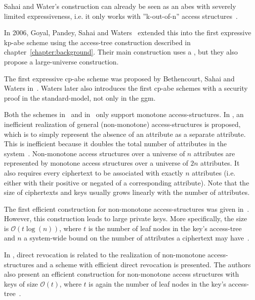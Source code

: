 Sahai and Water's construction can already be seen as an \acrshort{abes} with severely limited expressiveness, i.e. it only works with ''k-out-of-n'' access structures~\cite{goyal_attribute-based_2006}.

In 2006, Goyal, Pandey, Sahai and Waters~\cite{goyal_attribute-based_2006} extended this into the first expressive \acrlong{kp-abe} scheme using the \gls{access-tree} construction described in chapter~\ref{chapter:background}.
Their main construction uses a , but they also propose a \gls{large-universe} construction.

The first expressive \acrlong{cp-abe} scheme was proposed by Bethencourt, Sahai and Waters in~\cite{bethencourt_ciphertext-policy_2007}.
Waters \cite{waters_ciphertext-policy_2011} later also introduces the first \acrshort{cp-abe} schemes with a security proof in the \gls{standard-model}, not only in the \gls{ggm}.

Both the schemes in~\cite{goyal_attribute-based_2006} and in~\cite{bethencourt_ciphertext-policy_2007} only support monotone \glspl{access-structure}.
In \cite{goyal_attribute-based_2006}, an inefficient realization of general (non-monotone) \glspl{access-structure} is proposed, which is to simply represent the absence of an attribute as a separate attribute.
This is inefficient because it doubles the total number of attributes in the system~\cite{goyal_attribute-based_2006}. 
Non-monotone access structures over a universe of $n$ attributes are represented by monotone access structures over a universe of $2n$ attributes.
It also requires every ciphertext to be associated with exactly $n$ attributes (i.e. either with their positive or negated of a corresponding attribute).
Note that the size of ciphertexts and keys usually grows linearly with the number of attributes.

The first efficient construction for non-monotone \glspl{access-structure} was given in~\cite{ostrovsky_attribute-based_2007}. 
However, this construction leads to large private keys.
More specifically, the size is $\mathcal{O}(t \log(n))$, where $t$ is the number of leaf nodes in the key's \gls{access-tree} and $n$ a system-wide bound on the number of attributes a ciphertext may have~\cite{lewko_revocation_2008}.

In \cite{lewko_revocation_2008}, direct revocation is related to the realization of non-monotone \glspl{access-structure} and a scheme with efficient direct revocation is presented.
The authors also present an efficient construction for non-monotone access structures with keys of size $\mathcal{O}(t)$, where $t$ is again the number of leaf nodes in the key's \gls{access-tree}~\cite{lewko_revocation_2008}.

